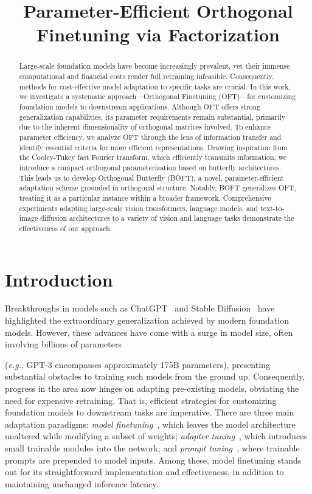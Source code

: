 \title{Parameter-Efficient Orthogonal Finetuning via Factorization}

\begin{abstract}
Large-scale foundation models have become increasingly prevalent, yet their immense computational and financial costs render full retraining infeasible. Consequently, methods for cost-effective model adaptation to specific tasks are crucial. In this work, we investigate a systematic approach—Orthogonal Finetuning (OFT)—for customizing foundation models to downstream applications. Although OFT offers strong generalization capabilities, its parameter requirements remain substantial, primarily due to the inherent dimensionality of orthogonal matrices involved. To enhance parameter efficiency, we analyze OFT through the lens of information transfer and identify essential criteria for more efficient representations. Drawing inspiration from the Cooley-Tukey fast Fourier transform, which efficiently transmits information, we introduce a compact orthogonal parameterization based on butterfly architectures. This leads us to develop Orthogonal Butterfly (BOFT), a novel, parameter-efficient adaptation scheme grounded in orthogonal structure. Notably, BOFT generalizes OFT, treating it as a particular instance within a broader framework. Comprehensive experiments adapting large-scale vision transformers, language models, and text-to-image diffusion architectures to a variety of vision and language tasks demonstrate the effectiveness of our approach.
\end{abstract}

\section{Introduction}

Breakthroughs in models such as ChatGPT~\cite{brown2020language,chen2021evaluating} and Stable Diffusion~\cite{rombach2022high} have highlighted the extraordinary generalization achieved by modern foundation models. However, these advances have come with a surge in model size, often involving billions of parameters

(\emph{e.g.}, GPT-3 encompasses approximately 175B parameters), presenting substantial obstacles to training such models from the ground up. Consequently, progress in the area now hinges on adapting pre-existing models, obviating the need for expensive retraining. That is, efficient strategies for customizing foundation models to downstream tasks are imperative. There are three main adaptation paradigms: \emph{model finetuning}~\cite{hulora2022,zaken2022bitfit,guo2020parameter,raffel2020exploring,qiu2023controlling,zhang2022adaptive,chavan2023one}, which leaves the model architecture unaltered while modifying a subset of weights; \emph{adapter tuning}~\cite{rebuffi2017learning,houlsby2019parameter,pfeiffer2020adapterfusion,lin2020exploring,he2021towards}, which introduces small trainable modules into the network; and \emph{prompt tuning}~\cite{li2021prefix,lester2021power}, where trainable prompts are prepended to model inputs. Among these, model finetuning stands out for its straightforward implementation and effectiveness, in addition to maintaining unchanged inference latency.

